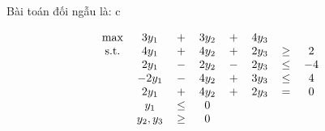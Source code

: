 \begin{solution}
    Bài toán đối ngẫu là: 
c

\begin{align*}
    \begin{tabular}{cccccccc}
        \text{max} & $3y_1$ & $+$ & $3y_2$ & $+$ & $4y_3$ \\
        \text{s.t.} & $4y_1$ & $+$ & $4y_2$ & $+$ & $2y_3$ & $\geq$ & $2$ \\
        & $2y_1$ & $-$ & $2y_2$ & $-$ & $2y_3$ & $\leq$ & $-4$ \\
        & $-2y_1$ & $-$ & $4y_2$ & $+$ & $3y_3$ & $\leq$ & $4$ \\
        & $2y_1$ & $+$ & $4y_2$ & $+$ & $2y_3$ & $=$ & $0$ \\
        & $y_1$ & $\leq$ & $0$ & & & & \\
        & $y_2,y_3$ & $\geq$ & $0$ & & & & \\
    \end{tabular}
\end{align*}
\end{solution}